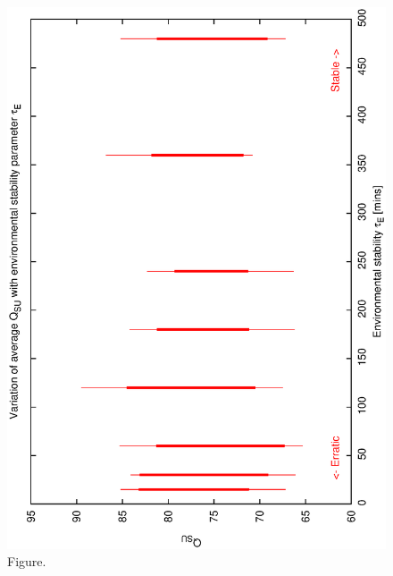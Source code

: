 \documentclass[12pt,a4paper]{article}
\begin{document}
\begin{figure}[htbp]
 \begin{center}
  \includegraphics[scale=1.0, angle=0]{figures/biasfr_de.eps}
 \end{center}
  \caption[Figure.]
{Figure.}
\end{figure}
\clearpage
\end{document}
